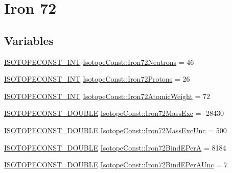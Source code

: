 \hypertarget{group___isotope_const-_iron-_fe72}{}\section{Iron 72}
\label{group___isotope_const-_iron-_fe72}
\subsection*{Variables}
\begin{DoxyCompactItemize}
\item 
\mbox{\hyperlink{group___isotope_const-_macros_ga5f18360b3e99483a35c32d789e62621c}{I\+S\+O\+T\+O\+P\+E\+C\+O\+N\+S\+T\+\_\+\+I\+NT}} \mbox{\hyperlink{group___isotope_const-_iron-_fe72_ga884c3a2cde1de8bcd23d706c13bd869d}{Isotope\+Const\+::\+Iron72\+Neutrons}} = 46
\item 
\mbox{\hyperlink{group___isotope_const-_macros_ga5f18360b3e99483a35c32d789e62621c}{I\+S\+O\+T\+O\+P\+E\+C\+O\+N\+S\+T\+\_\+\+I\+NT}} \mbox{\hyperlink{group___isotope_const-_iron-_fe72_ga759a14d5da8071bdb7910aa4a8379734}{Isotope\+Const\+::\+Iron72\+Protons}} = 26
\item 
\mbox{\hyperlink{group___isotope_const-_macros_ga5f18360b3e99483a35c32d789e62621c}{I\+S\+O\+T\+O\+P\+E\+C\+O\+N\+S\+T\+\_\+\+I\+NT}} \mbox{\hyperlink{group___isotope_const-_iron-_fe72_ga50d546f4342b2d47d1911cb5945d718d}{Isotope\+Const\+::\+Iron72\+Atomic\+Weight}} = 72
\item 
\mbox{\hyperlink{group___isotope_const-_macros_ga8f45a7272ce02c0b4c65c44636ed719a}{I\+S\+O\+T\+O\+P\+E\+C\+O\+N\+S\+T\+\_\+\+D\+O\+U\+B\+LE}} \mbox{\hyperlink{group___isotope_const-_iron-_fe72_ga26eff95f9624679a32607e19f3eac6fc}{Isotope\+Const\+::\+Iron72\+Mass\+Exc}} = -\/28430
\item 
\mbox{\hyperlink{group___isotope_const-_macros_ga8f45a7272ce02c0b4c65c44636ed719a}{I\+S\+O\+T\+O\+P\+E\+C\+O\+N\+S\+T\+\_\+\+D\+O\+U\+B\+LE}} \mbox{\hyperlink{group___isotope_const-_iron-_fe72_ga9adfbb9b4a9f1a3fe9d889ee588a6c7c}{Isotope\+Const\+::\+Iron72\+Mass\+Exc\+Unc}} = 500
\item 
\mbox{\hyperlink{group___isotope_const-_macros_ga8f45a7272ce02c0b4c65c44636ed719a}{I\+S\+O\+T\+O\+P\+E\+C\+O\+N\+S\+T\+\_\+\+D\+O\+U\+B\+LE}} \mbox{\hyperlink{group___isotope_const-_iron-_fe72_gaf1a5ca426ec55e887f628739df74af93}{Isotope\+Const\+::\+Iron72\+Bind\+E\+PerA}} = 8184
\item 
\mbox{\hyperlink{group___isotope_const-_macros_ga8f45a7272ce02c0b4c65c44636ed719a}{I\+S\+O\+T\+O\+P\+E\+C\+O\+N\+S\+T\+\_\+\+D\+O\+U\+B\+LE}} \mbox{\hyperlink{group___isotope_const-_iron-_fe72_gac0c36d089e573e3a0c21c5e5ce4e62c9}{Isotope\+Const\+::\+Iron72\+Bind\+E\+Per\+A\+Unc}} = 7

\end{DoxyCompactItemize}
